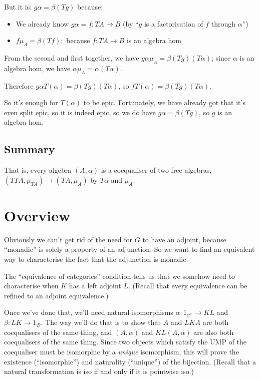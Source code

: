 \documentclass[11pt]{amsart}
\begin{document}
But it is: $g \alpha = \beta (Tg)$ because:

\begin{itemize}
\item We already know $g \alpha = f: TA \to B$ (by ``$g$ is a factorisation of $f$ through $\alpha$'')
\item $f \mu_A = \beta (T f): $ because $f: TA \to B$ is an algebra hom
\end{itemize}

From the second and first together, we have $g \alpha \mu_A = \beta (T g) (T \alpha)$;
since $\alpha$ is an algebra hom, we have $\alpha \mu_A = \alpha (T \alpha)$.

Therefore $g \alpha T(\alpha) = \beta (Tg)(T \alpha)$, so $f T(\alpha) = \beta (Tg)(T\alpha)$.

So it's enough for $T(\alpha)$ to be epic.
Fortunately, we have already got that it's even split epic, so it is indeed epic, so we do have $g \alpha = \beta (Tg)$, so $g$ is an algebra hom.

\subsection{Summary}

That is, every algebra $(A, \alpha)$ is a coequaliser of two free algebras, $(TTA, \mu_{TA}) \to (TA, \mu_A)$ by $T \alpha$ and $\mu_A$.

\section{Overview}

Obviously we can't get rid of the need for $G$ to have an adjoint, because ``monadic'' is solely a property of an adjunction.
So we want to find an equivalent way to characterise the fact that the adjunction is monadic.

The ``equivalence of categories'' condition tells us that we somehow need to characterise when $K$ has a left adjoint $L$.
(Recall that every equivalence can be refined to an adjoint equivalence.)

Once we've done that, we'll need natural isomorphisms $\alpha: 1_{\mathcal{C}^{\mathbb{T}}} \to KL$ and $\beta: LK \to 1_{\mathcal{D}}$.
The way we'll do that is to show that $A$ and $LKA$ are both coequalisers of the same thing, and $(A, \alpha)$ and $KL(A, \alpha)$ are also both coequalisers of the same thing.
Since two objects which satisfy the UMP of the coequaliser must be isomorphic by a \emph{unique} isomorphism, this will prove the existence (``isomorphic'') and naturality (``unique'') of the bijection.
(Recall that a natural transformation is iso if and only if it is pointwise iso.)
\end{document}
